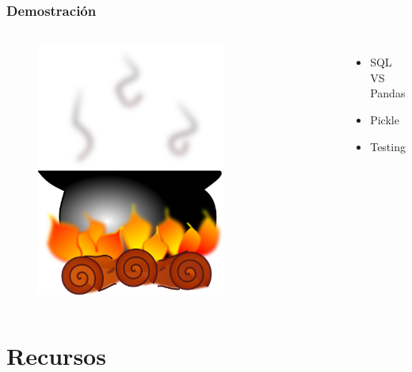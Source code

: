 \documentclass{beamer}
\begin{document}
\begin{frame}
\frametitle{Demostración}
\begin{columns}[c] %

  \begin{figure}
    \centering
    \includegraphics[width=0.7\textwidth]{olla.png}
  \end{figure}

\begin{itemize}
\item SQL VS Pandas
\item Pickle
\item Testing
\end{itemize}


\end{columns}
\end{frame}

\section{Recursos}
\end{document}
